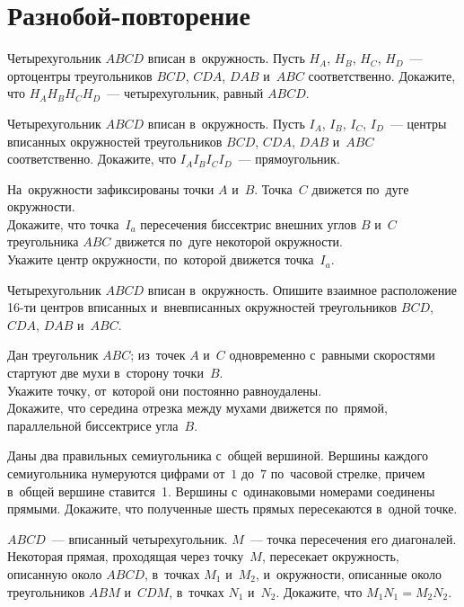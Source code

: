 
\section*{Разнобой-повторение}


\begin{problems}

\item
Четырехугольник $ABCD$ вписан в~окружность.
Пусть $H_A$, $H_B$, $H_C$, $H_D$~--- ортоцентры треугольников
$BCD$, $CDA$, $DAB$ и~$ABC$ соответственно.
Докажите, что $H_A H_B H_C H_D$~--- четырехугольник, равный $ABCD$.

\item
Четырехугольник $ABCD$ вписан в~окружность.
Пусть $I_A$, $I_B$, $I_C$, $I_D$~--- центры вписанных окружностей треугольников
$BCD$, $CDA$, $DAB$ и~$ABC$ соответственно.
Докажите, что $I_A I_B I_C I_D$~--- прямоугольник.

\item
На~окружности зафиксированы точки $A$ и~$B$.
Точка~$C$ движется по~дуге окружности.
\\
\sp
Докажите, что точка~$I_a$ пересечения биссектрис внешних углов $B$ и~$C$
треугольника $ABC$ движется по~дуге некоторой окружности.
\\
\sp
Укажите центр окружности, по~которой движется точка~$I_a$.

\item
Четырехугольник $ABCD$ вписан в~окружность.
Опишите взаимное расположение 16-ти центров вписанных и~вневписанных
окружностей треугольников $BCD$, $CDA$, $DAB$ и~$ABC$.

\item
Дан треугольник $ABC$;
из~точек $A$ и~$C$ одновременно с~равными скоростями стартуют две мухи
в~сторону точки~$B$.
\\
\sp
Укажите точку, от~которой они постоянно равноудалены.
\\
\sp
Докажите, что середина отрезка между мухами движется по~прямой, параллельной
биссектрисе угла~$B$.

\item
Даны два правильных семиугольника с~общей вершиной.
Вершины каждого семиугольника нумеруются цифрами от~$1$ до~$7$ по~часовой
стрелке, причем в~общей вершине ставится~1.
Вершины с~одинаковыми номерами соединены прямыми.
Докажите, что полученные шесть прямых пересекаются в~одной точке.

\item
$ABCD$~--- вписанный четырехугольник.
$M$~--- точка пересечения его диагоналей.
Некоторая прямая, проходящая через точку~$M$, пересекает
окружность, описанную около $ABCD$, в~точках $M_1$ и~$M_2$, и~окружности,
описанные около треугольников $ABM$ и~$CDM$, в~точках $N_1$ и~$N_2$.
Докажите, что $M_1 N_1 = M_2 N_2$.

\end{problems}

